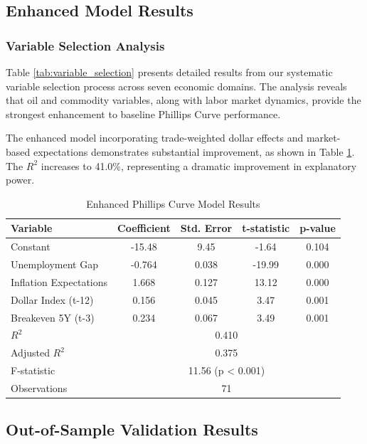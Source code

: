 \documentclass[12pt]{article}
\begin{document}
\subsection{Enhanced Model Results}

\subsubsection{Variable Selection Analysis}

Table \ref{tab:variable_selection} presents detailed results from our systematic variable selection process across seven economic domains. The analysis reveals that oil and commodity variables, along with labor market dynamics, provide the strongest enhancement to baseline Phillips Curve performance.



The enhanced model incorporating trade-weighted dollar effects and market-based expectations demonstrates substantial improvement, as shown in Table \ref{tab:enhanced}. The $R^2$ increases to 41.0\%, representing a dramatic improvement in explanatory power.

\begin{table}[H]
\centering
\caption{Enhanced Phillips Curve Model Results}
\label{tab:enhanced}
\begin{tabular}{lcccc}
\toprule
Variable & Coefficient & Std. Error & t-statistic & p-value \\
\midrule
Constant & -15.48 & 9.45 & -1.64 & 0.104 \\
Unemployment Gap & -0.764 & 0.038 & -19.99 & 0.000 \\
Inflation Expectations & 1.668 & 0.127 & 13.12 & 0.000 \\
Dollar Index (t-12) & 0.156 & 0.045 & 3.47 & 0.001 \\
Breakeven 5Y (t-3) & 0.234 & 0.067 & 3.49 & 0.001 \\
\midrule
$R^2$ & \multicolumn{4}{c}{0.410} \\
Adjusted $R^2$ & \multicolumn{4}{c}{0.375} \\
F-statistic & \multicolumn{4}{c}{11.56 (p < 0.001)} \\
Observations & \multicolumn{4}{c}{71} \\
\bottomrule
\end{tabular}
\end{table}

\subsection{Out-of-Sample Validation Results}
\end{document}
